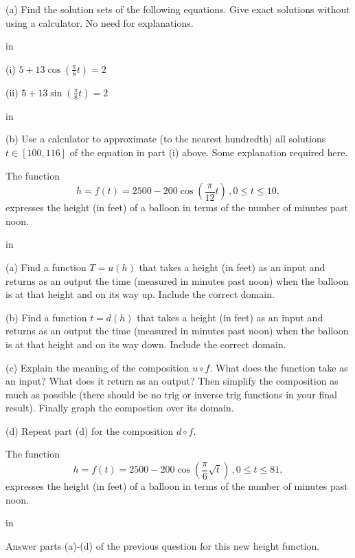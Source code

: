 \documentclass{ximera}
\newcommand{\pskip}{\vskip 0.1 in}
\begin{document}
\begin{question} \label{Q23:InverseTrig}
(a) Find the solution sets of the following equations. Give exact solutions without using a calculator. No need for explanations.

\pskip

(i) $5 + 13 \cos \left( \frac{\pi}{8}t \right) = 2$

(ii) $5 + 13 \sin \left( \frac{\pi}{8}t \right) = 2$

\pskip

(b) Use a calculator to approximate (to the nearest hundredth) all solutions $t\in [100, 116]$ of the equation in part (i) above. Some explanation required here.

\end{question}


\begin{question} \label{Q25:InverseTrig}
The function
\[
  h = f(t) = 2500 - 200 \cos \left(  \frac{\pi}{12}t  \right) \, , 0\leq t \leq 10 ,
\]
expresses the height (in feet) of a balloon in terms of the number of minutes past noon.

\pskip

(a) Find a function $T=u(h)$ that takes a height (in feet) as an input and returns as an output the time (measured in minutes past noon) when the balloon is at that height and on its way up. Include the correct domain.

(b) Find a function $t=d(h)$ that  takes a height (in feet) as an input and returns as an output the time (measured in minutes past noon) when the balloon is at that height and on its way down. Include the correct domain.

(c) Explain the meaning of the composition $u\circ f$. What does the function take as an input? What does it return as an output? Then simplify the composition as much as possible (there should be no trig or inverse trig functions in your final result). Finally graph the compostion over its domain.

(d) Repeat part (d) for the composition $d\circ f$.

\end{question}



\begin{question} \label{Q28:InverseTrig}
The function
\[
  h = f(t) = 2500 - 200 \cos \left(  \frac{\pi}{6} \sqrt{t}  \right) \, , 0\leq t \leq 81 ,
\]
expresses the height (in feet) of a balloon in terms of the number of minutes past noon.

\pskip

Answer parts (a)-(d) of the previous question for this new height function.

\end{question}
\end{document}
